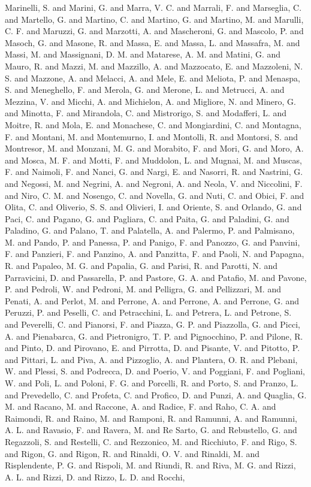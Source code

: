 {{{{Marinelli, S.  and Marini, G.  and Marra, V. C.  and Marrali, F.  and Marseglia, C.  and Martello, G.  and Martino, C.  and Martino, G.  and Martino, M.  and Marulli, C. F.  and Maruzzi, G.  and Marzotti, A.  and Mascheroni, G.  and Mascolo, P.  and Masoch, G.  and Masone, R.  and Massa, E.  and Massa, L.  and Massafra, M.  and Massi, M.  and Massignani, D. M.  and Matarese, A. M.  and Matini, G.  and Mauro, R.  and Mazzi, M.  and Mazzillo, A.  and Mazzocato, E.  and Mazzoleni, N. S.  and Mazzone, A.  and Melacci, A.  and Mele, E.  and Meliota, P.  and Menaspa, S.  and Meneghello, F.  and Merola, G.  and Merone, L.  and Metrucci, A.  and Mezzina, V.  and Micchi, A.  and Michielon, A.  and Migliore, N.  and Minero, G.  and Minotta, F.  and Mirandola, C.  and Mistrorigo, S.  and Modafferi, L.  and Moitre, R.  and Mola, E.  and Monachese, C.  and Mongiardini, C.  and Montagna, F.  and Montani, M.  and Montemurno, I.  and Montolli, R.  and Montorsi, S.  and Montresor, M.  and Monzani, M. G.  and Morabito, F.  and Mori, G.  and Moro, A.  and Mosca, M. F.  and Motti, F.  and Muddolon, L.  and Mugnai, M.  and Muscas, F.  and Naimoli, F.  and Nanci, G.  and Nargi, E.  and Nasorri, R.  and Nastrini, G.  and Negossi, M.  and Negrini, A.  and Negroni, A.  and Neola, V.  and Niccolini, F.  and Niro, C. M.  and Nosengo, C.  and Novella, G.  and Nuti, C.  and Obici, F.  and Olita, C.  and Oliverio, S. S.  and Olivieri, I.  and Oriente, S.  and Orlando, G.  and Paci, C.  and Pagano, G.  and Pagliara, C.  and Paita, G.  and Paladini, G.  and Paladino, G.  and Palano, T.  and Palatella, A.  and Palermo, P.  and Palmisano, M.  and Pando, P.  and Panessa, P.  and Panigo, F.  and Panozzo, G.  and Panvini, F.  and Panzieri, F.  and Panzino, A.  and Panzitta, F.  and Paoli, N.  and Papagna, R.  and Papaleo, M. G.  and Papalia, G.  and Parisi, R.  and Parotti, N.  and Parravicini, D.  and Passarella, P.  and Pastore, G. A.  and Patafio, M.  and Pavone, P.  and Pedroli, W.  and Pedroni, M.  and Pelligra, G.  and Pellizzari, M.  and Penati, A.  and Perlot, M.  and Perrone, A.  and Perrone, A.  and Perrone, G.  and Peruzzi, P.  and Peselli, C.  and Petracchini, L.  and Petrera, L.  and Petrone, S.  and Peverelli, C.  and Pianorsi, F.  and Piazza, G. P.  and Piazzolla, G.  and Picci, A.  and Pienabarca, G.  and Pietronigro, T. P.  and Pignocchino, P.  and Pilone, R.  and Pinto, D.  and Pirovano, E.  and Pirrotta, D.  and Pisante, V.  and Pitotto, P.  and Pittari, L.  and Piva, A.  and Pizzoglio, A.  and Plantera, O. R.  and Plebani, W.  and Plessi, S.  and Podrecca, D.  and Poerio, V.  and Poggiani, F.  and Pogliani, W.  and Poli, L.  and Poloni, F. G.  and Porcelli, R.  and Porto, S.  and Pranzo, L.  and Prevedello, C.  and Profeta, C.  and Profico, D.  and Punzi, A.  and Quaglia, G. M.  and Racano, M.  and Raccone, A.  and Radice, F.  and Raho, C. A.  and Raimondi, R.  and Raino, M.  and Ramponi, R.  and Ramunni, A.  and Ramunni, A. L.  and Ravasio, F.  and Ravera, M.  and Re Sarto, G.  and Rebustello, G.  and Regazzoli, S.  and Restelli, C.  and Rezzonico, M.  and Ricchiuto, F.  and Rigo, S.  and Rigon, G.  and Rigon, R.  and Rinaldi, O. V.  and Rinaldi, M.  and Risplendente, P. G.  and Rispoli, M.  and Riundi, R.  and Riva, M. G.  and Rizzi, A. L.  and Rizzi, D.  and Rizzo, L. D.  and Rocchi, }}}}
